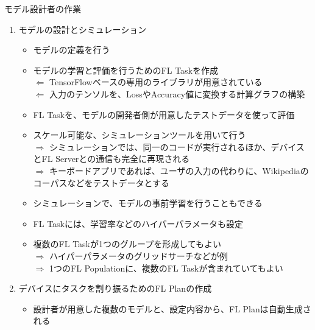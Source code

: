 \documentclass[dvipdfmx,notheorems,t]{beamer}
\begin{document}
\begin{frame}{モデル設計者の作業}

\begin{enumerate}
	\item モデルの設計とシミュレーション
	\begin{itemize}
		\item モデルの定義を行う
		\item モデルの学習と評価を行うためのFL Taskを作成 \\
		$\Leftarrow$ TensorFlowベースの専用のライブラリが用意されている \\
		$\Leftarrow$ 入力のテンソルを、LossやAccuracy値に変換する計算グラフの構築
		\newline
		
		\item FL Taskを、モデルの開発者側が用意したテストデータを使って評価
		\newline
		
		\item スケール可能な、シミュレーションツールを用いて行う \\
		$\Rightarrow$ シミュレーションでは、同一のコードが実行されるほか、デバイスとFL Serverとの通信も完全に再現される \\
		$\Rightarrow$ キーボードアプリであれば、ユーザの入力の代わりに、Wikipediaのコーパスなどをテストデータとする
		\newline
		
		\item シミュレーションで、モデルの事前学習を行うこともできる
		\newline
		
		\item FL Taskには、学習率などのハイパーパラメータも設定
		\item 複数のFL Taskが1つのグループを形成してもよい \\
		$\Rightarrow$ ハイパーパラメータのグリッドサーチなどが例 \\
		$\Rightarrow$ 1つのFL Populationに、複数のFL Taskが含まれていてもよい
	\end{itemize}
	
	\framebreak

	\item デバイスにタスクを割り振るためのFL Planの作成
	\begin{itemize}
		\item 設計者が用意した複数のモデルと、設定内容から、FL Planは自動生成される
		\newline
		

\end{itemize}
\end{enumerate}
\end{frame}
\end{document}
